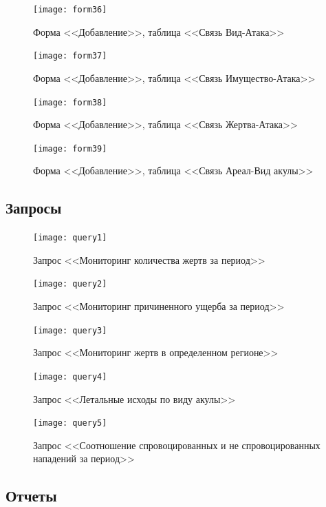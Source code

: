 \documentclass[russian,utf8,simple,emptystyle]{eskdtext}
\begin{document}
\begin{figure}[hb]
\centering
\texttt{[image: form36]}
\caption{Форма <<Добавление>>, таблица <<Связь Вид-Атака>>}
\end{figure}

\begin{figure}[ht]
\centering
\texttt{[image: form37]}
\caption{Форма <<Добавление>>, таблица <<Связь Имущество-Атака>>}
\end{figure}

\begin{figure}[hb]
\centering
\texttt{[image: form38]}
\caption{Форма <<Добавление>>, таблица <<Связь Жертва-Атака>>}
\end{figure}

\begin{figure}[ht]
\centering
\texttt{[image: form39]}
\caption{Форма <<Добавление>>, таблица <<Связь Ареал-Вид акулы>>}
\end{figure}

\clearpage
\subsection{Запросы}

\begin{figure}[ht]
\centering
\texttt{[image: query1]}
\caption{Запрос <<Мониторинг количества жертв за период>>}
\end{figure}


\begin{figure}[ht]
\centering
\texttt{[image: query2]}
\caption{Запрос <<Мониторинг причиненного ущерба за период>>}
\end{figure}

\begin{figure}[ht]
\centering
\texttt{[image: query3]}
\caption{Запрос <<Мониторинг жертв в определенном регионе>>}
\end{figure}

\begin{figure}[ht]
\centering
\texttt{[image: query4]}
\caption{Запрос <<Летальные исходы по виду акулы>>}
\end{figure}

\begin{figure}[ht]
\centering
\texttt{[image: query5]}
\caption{Запрос <<Соотношение спровоцированных и не спровоцированных нападений за период>>}
\end{figure}

\clearpage
\subsection{Отчеты}
\end{document}
